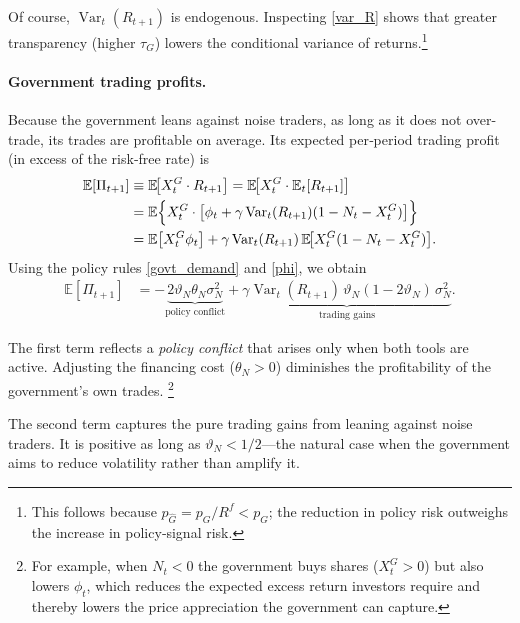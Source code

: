 \documentclass[12pt]{article}
\begin{document}
Of course, \(\operatorname{Var}_t(R_{t+1})\) is endogenous.  Inspecting \eqref{var_R} shows that greater transparency (higher \(\tau_G\)) lowers the conditional variance of returns.\footnote{This follows because \(p_{\hat{G}} = p_G/R^f < p_G\); the reduction in policy risk outweighs the increase in policy‑signal risk.}

\paragraph{Government trading profits.}

Because the government leans against noise traders, as long as it does not over-trade, its trades are profitable on average.  Its expected per‑period trading profit (in excess of the risk‑free rate) is
\begin{align*}
    \mathbb{E}[\Pi_{t+1}] &\equiv \mathbb{E}\!\bigl[ X_t^G \cdot R_{t+1} \bigr] 
                          = \mathbb{E}\!\bigl[ X_t^G \cdot \mathbb{E}_t[R_{t+1}] \bigr] \\
    &= \mathbb{E}\Bigl\{ X_t^G \cdot 
        \bigl[ \phi_t + \gamma \operatorname{Var}_t(R_{t+1}) (1 - N_t - X_t^G) \bigr] \Bigr\} \\
    &= \mathbb{E}\bigl[ X_t^G \phi_t \bigr] 
       + \gamma \operatorname{Var}_t(R_{t+1}) \,
         \mathbb{E}\!\bigl[ X_t^G (1 - N_t - X_t^G) \bigr].
\end{align*}
Using the policy rules \eqref{govt_demand} and \eqref{phi}, we obtain
\begin{align}
    \mathbb{E}[\Pi_{t+1}] 
    &= - \underbrace{2\vartheta_N\theta_N\sigma_N^2}_{\text{policy conflict}}
       + \underbrace{\gamma \operatorname{Var}_t(R_{t+1}) \,
                     \vartheta_N (1-2\vartheta_N)\,\sigma_N^2}_{\text{trading gains}} .
    \label{govt_profit}
\end{align}

The first term reflects a \emph{policy conflict} that arises only when both tools are active.  
Adjusting the financing cost (\(\theta_N > 0\)) diminishes the profitability of the government's own trades.%
\footnote{For example, when \(N_t<0\) the government buys shares (\(X_t^G>0\)) but also lowers \(\phi_t\), which reduces the expected excess return investors require and thereby lowers the price appreciation the government can capture.}

The second term captures the pure trading gains from leaning against noise traders.  
It is positive as long as \(\vartheta_N < 1/2\)—the natural case when the government aims to reduce volatility rather than amplify it.  
\end{document}
